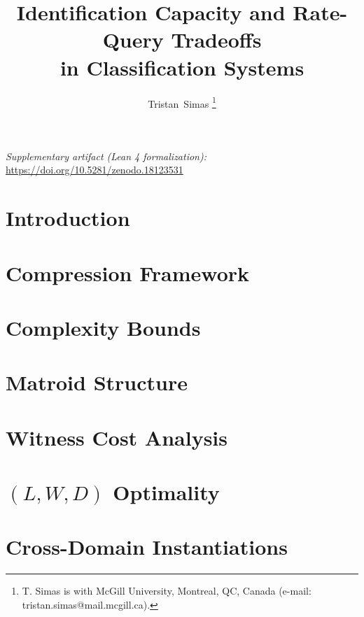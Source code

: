 \documentclass[12pt, onecolumn, draftclsnofoot]{IEEEtran}
\title{Identification Capacity and Rate-Query Tradeoffs\\ in Classification Systems}
\author{Tristan~Simas%
\thanks{T. Simas is with McGill University, Montreal, QC, Canada (e-mail: tristan.simas@mail.mcgill.ca).}}
\begin{document}
\ifdefined\JSAITREVIEW\doublespacing\fi

\maketitle


\ifdefined\JSAITREVIEW
\noindent\textit{Supplementary artifact (Lean 4 formalization):} \url{https://doi.org/10.5281/zenodo.18123531}
\par\medskip
\fi

\section{Introduction}


\section{Compression Framework}\label{sec:framework}


\section{Complexity Bounds}\label{sec:complexity}


\section{Matroid Structure}\label{sec:matroid}


\section{Witness Cost Analysis}\label{sec:witness}


\section{\texorpdfstring{$(L, W, D)$}{(L, W, D)} Optimality}\label{sec:lwd}


\section{Cross-Domain Instantiations}\label{sec:applications}

\end{document}
